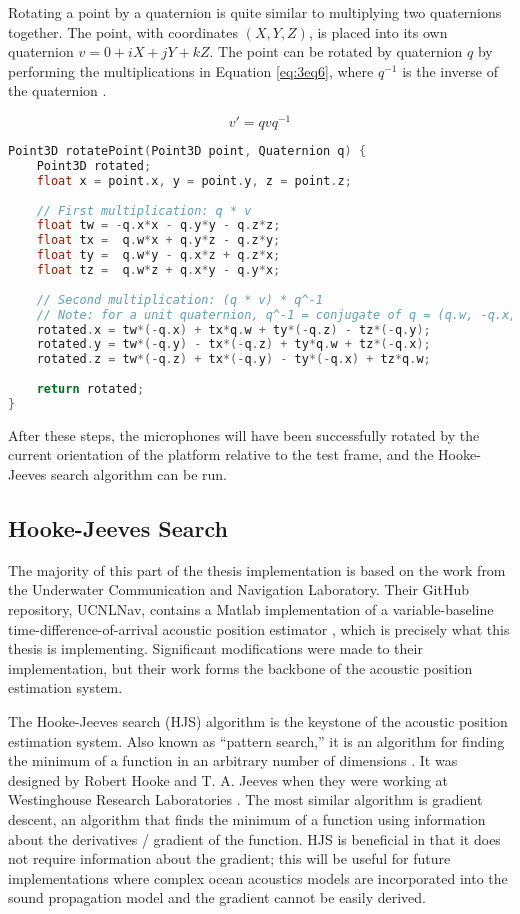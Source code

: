 \documentclass[12pt,a4paper]{report}
\begin{document}
Rotating a point by a quaternion is quite similar to multiplying two quaternions together. The point, with coordinates \((X, Y, Z)\), is placed into its own quaternion \(v = 0 + iX + jY + kZ\). The point can be rotated by quaternion \(q\) by performing the multiplications in Equation \ref{eq:3eq6}, where \(q^{-1}\) is the inverse of the quaternion \cite{quaternionuse}.

\begin{equation} \label{eq:3eq6}
	v' = qvq^{-1}
\end{equation}

\begin{lstlisting}[language=C++]
Point3D rotatePoint(Point3D point, Quaternion q) {
	Point3D rotated;
	float x = point.x, y = point.y, z = point.z;
	
	// First multiplication: q * v
	float tw = -q.x*x - q.y*y - q.z*z;
	float tx =  q.w*x + q.y*z - q.z*y;
	float ty =  q.w*y - q.x*z + q.z*x;
	float tz =  q.w*z + q.x*y - q.y*x;
	
	// Second multiplication: (q * v) * q^-1
	// Note: for a unit quaternion, q^-1 = conjugate of q = (q.w, -q.x, -q.y, -q.z)
	rotated.x = tw*(-q.x) + tx*q.w + ty*(-q.z) - tz*(-q.y);
	rotated.y = tw*(-q.y) - tx*(-q.z) + ty*q.w + tz*(-q.x);
	rotated.z = tw*(-q.z) + tx*(-q.y) - ty*(-q.x) + tz*q.w;
	
	return rotated;
}
\end{lstlisting}

After these steps, the microphones will have been successfully rotated by the current orientation of the platform relative to the test frame, and the Hooke-Jeeves search algorithm can be run.

\subsection{Hooke-Jeeves Search} \label{ssec:3s9s2}
The majority of this part of the thesis implementation is based on the work from the Underwater Communication and Navigation Laboratory. Their GitHub repository, UCNLNav, contains a Matlab implementation of a variable-baseline time-difference-of-arrival acoustic position estimator \cite{ucnlnav}, which is precisely what this thesis is implementing. Significant modifications were made to their implementation, but their work forms the backbone of the acoustic position estimation system.

The Hooke-Jeeves search (HJS) algorithm is the keystone of the acoustic position estimation system. Also known as “pattern search,” it is an algorithm for finding the minimum of a function in an arbitrary number of dimensions \cite{hjsstan}. It was designed by Robert Hooke and T. A. Jeeves when they were working at Westinghouse Research Laboratories \cite{hjsog}. The most similar algorithm is gradient descent, an algorithm that finds the minimum of a function using information about the derivatives / gradient of the function. HJS is beneficial in that it does not require information about the gradient; this will be useful for future implementations where complex ocean acoustics models are incorporated into the sound propagation model and the gradient cannot be easily derived.
\end{document}
